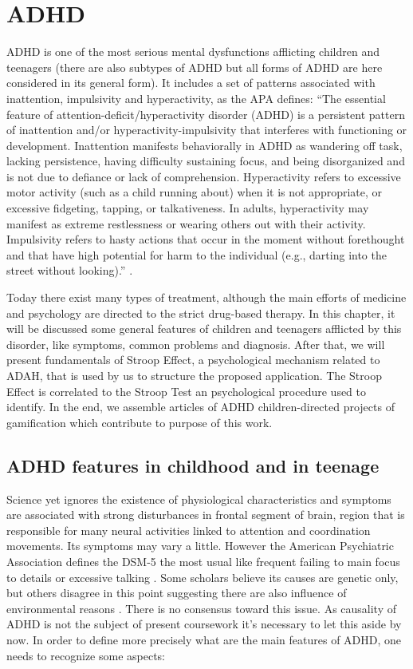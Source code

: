 \chapter{ADHD}
\label{ch:ADHD}


ADHD is one of the most serious mental dysfunctions afflicting children and teenagers (there are also subtypes of ADHD but all forms of ADHD are here considered in its general form). It includes a set of patterns associated with inattention, impulsivity and hyperactivity, as the APA defines: ``The essential feature of attention-deficit/hyperactivity disorder (ADHD) is a persistent pattern of inattention and/or hyperactivity-impulsivity that interferes with functioning or development. Inattention manifests behaviorally in ADHD as wandering off task, lacking persistence, having difficulty sustaining focus, and being disorganized and is not due to defiance or lack of comprehension. Hyperactivity refers to excessive motor activity (such as a child running about) when it is not appropriate, or excessive fidgeting, tapping, or talkativeness. In adults, hyperactivity may manifest as extreme restlessness or wearing others out with their activity. Impulsivity refers to hasty actions that occur in the moment without forethought and that have high potential for harm to the individual (e.g., darting into the street without looking).'' \citep{dsm-american}. 

Today there exist many types of treatment, although the main efforts of medicine and psychology are directed to the strict drug-based therapy. In this chapter, it will be discussed some general features of children and teenagers afflicted by this disorder, like symptoms, common problems and diagnosis. After that, we will present fundamentals of Stroop Effect, a psychological mechanism related to ADAH, that is used by us to structure the proposed application. The Stroop Effect is correlated to the Stroop Test an psychological procedure used to identify. In the end, we assemble articles of ADHD children-directed projects of gamification which contribute to purpose of this work. 


\section{ADHD features in childhood and in teenage}

Science yet ignores the existence of physiological characteristics and symptoms are associated with strong disturbances in frontal segment of brain, region that is responsible for many neural activities linked to attention and coordination movements. Its symptoms may vary a little. However the American Psychiatric Association defines the DSM-5 the most usual like frequent failing to main focus to details or excessive talking \citep{association2013dsm, Ahma-2013}. Some scholars believe its causes are genetic only, but others disagree in this point suggesting there are also influence of environmental reasons \citep{ADHDDay}. There is no consensus toward this issue. As causality of ADHD is not the subject of present coursework it's necessary to let this aside by now. In order to define more precisely what are the main features of ADHD, one needs to recognize some aspects:

